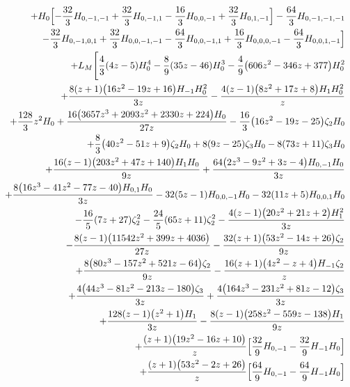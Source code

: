 \begin{eqnarray}
\nonumber\\&&
+H_0 \Bigl[-\frac{32}{3} H_{0,-1,-1}+\frac{32}{3}   H_{0,-1,1}-\frac{16}{3} H_{0,0,-1}
+\frac{32}{3}   H_{0,1,-1}\Bigr]-\frac{64}{3} H_{0,-1,-1,-1}
\nonumber\\&&
-\frac{32}{3} H_{0,-1,0,1}
+\frac{32}{3}  H_{0,0,-1,-1}
-\frac{64}{3} H_{0,0,-1,1}
+\frac{16}{3}  H_{0,0,0,-1}
-\frac{64}{3} H_{0,0,1,-1}
\Bigr]
\nonumber \\
&&+L_M
\Biggl[\frac{4}{3} (4 z-5) H_0^4-\frac{8}{9}  (35 z-46) H_0^3-\frac{4}{9} \big(606 z^2-346 z+377\big) H_0^2
\nonumber\\&&
+\frac{8  (z+1) \big(16 z^2-19 z+16\big) H_{-1} H_0^2}{3 z}-\frac{4
  (z-1) \big(8 z^2+17 z+8\big) H_1 H_0^2}{z}
\nonumber\\&&
+\frac{128}{3}  z^2 H_0+\frac{16 \big(3657 z^3+2093 z^2+2330 z+224\big)
  H_0}{27 z}-\frac{16}{3} \big(16 z^2-19 z-25\big) \zeta_2 H_0
\nonumber\\&&
+\frac{8}{3}  \big(40 z^2-51 z+9\big) \zeta_2 H_0+8  (9 z-25)
\zeta_3 H_0-8 (73 z+11) \zeta_3 H_0
\nonumber\\&&
+\frac{16 (z-1) \big(203 z^2+47 z+140\big) H_1 H_0}{9 z}+\frac{64 
  \big(2 z^3-9 z^2+3 z-4\big) H_{0,-1} H_0}{3 z}
\nonumber\\&&
+\frac{8 \big(16 z^3-41 z^2-77 z-40\big) H_{0,1} H_0}{3 z}-32  (5 z-1)
H_{0,0,-1} H_0-32 (11 z+5) H_{0,0,1} H_0
\nonumber\\&&
-\frac{16}{5}  (7 z+27) \zeta_2^2-\frac{24}{5} (65 z+11) \zeta_2^2-\frac{4 (z-1) \big(20 z^2+21 z+2\big) H_1^2}{3 z}
\nonumber\\&&
-\frac{8 (z-1) \big(11542 z^2+399 z+4036\big)}{27 z}-\frac{32  (z+1)
  \big(53 z^2-14 z+26\big) \zeta_2}{9 z}
\nonumber\\&&
+\frac{8 \big(80 z^3-157 z^2+521 z-64\big) \zeta_2}{9 z}-\frac{16 
  (z+1) \big(4 z^2-z+4\big) H_{-1} \zeta_2}{z}
\nonumber\\&&
+\frac{4 \big(44 z^3-81 z^2-213 z-180\big) \zeta_3}{3 z}+\frac{4 
  \big(164 z^3-231 z^2+81 z-12\big) \zeta_3}{3 z}
\nonumber\\&&
+\frac{128  (z-1) \big(z^2+1\big) H_1}{3 z}-\frac{8 (z-1) \big(258
  z^2-559 z-138\big) H_1}{9 z}
\nonumber\\&&
+\frac{(z+1) \big(19 z^2-16 z+10\big)}{z} \Bigl[\frac{32}{9} H_{0,-1}-\frac{32}{9}
  H_{-1} H_0\Bigr]
\nonumber\\&&
+\frac{(z+1) \big(53 z^2-2 z+26\big)}{z} \Bigl[\frac{64}{9} 
  H_{0,-1}-\frac{64}{9}  H_{-1} H_0\Bigr]
\nonumber\\&&

\end{eqnarray}
